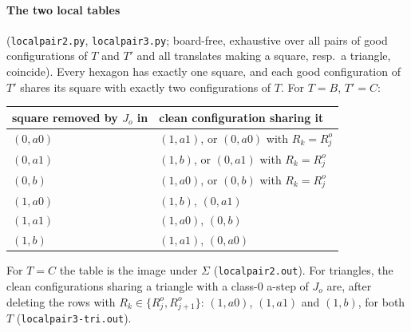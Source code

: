 \documentclass[11pt]{article}
\theoremstyle{definition}\newtheorem{definition}[theorem]{Definition}\newtheorem{remark}[theorem]{Remark}
\begin{document}
\paragraph{The two local tables} (\texttt{localpair2.py}, \texttt{localpair3.py}; board-free, exhaustive over all pairs of good configurations of $T$ and $T'$ and all translates making a square, resp.\ a triangle, coincide).
Every hexagon has exactly one square, and each good configuration of $T'$ shares its square with exactly two configurations of $T$. For $T=B$, $T'=C$:
\begin{center}\begin{tabular}{ll}\toprule
square removed by $J_o$ in & clean configuration sharing it\\\midrule
$(0,a0)$ & $(1,a1)$, or $(0,a0)$ with $R_k=R^o_j$\\
$(0,a1)$ & $(1,b)$, or $(0,a1)$ with $R_k=R^o_j$\\
$(0,b)$ & $(1,a0)$, or $(0,b)$ with $R_k=R^o_j$\\
$(1,a0)$ & $(1,b)$, $(0,a1)$\\
$(1,a1)$ & $(1,a0)$, $(0,b)$\\
$(1,b)$ & $(1,a1)$, $(0,a0)$\\\bottomrule
\end{tabular}\end{center}
For $T=C$ the table is the image under $\Sigma$ (\texttt{localpair2.out}). For triangles, the clean configurations sharing a triangle with a class-0 a-step of $J_o$ are, after deleting the rows with $R_k\in\{R^o_j,R^o_{j+1}\}$: $(1,a0)$, $(1,a1)$ and $(1,b)$, for both $T$ (\texttt{localpair3-tri.out}).
\end{document}
